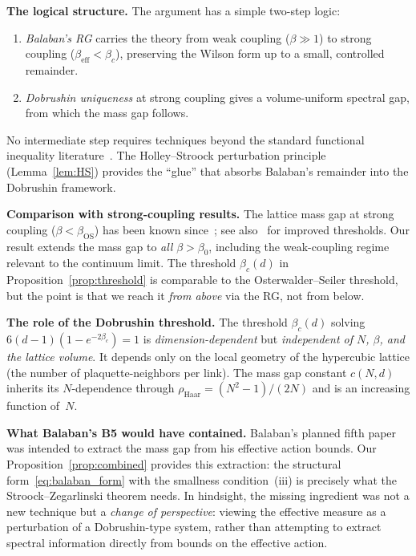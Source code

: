 \documentclass[11pt]{article}
\theoremstyle{definition}
\theoremstyle{remark}
\newcommand{\Haar}{\mathrm{Haar}}
\begin{document}
\textbf{The logical structure.}
The argument has a simple two-step logic:
\begin{enumerate}
\item \emph{Balaban's RG} carries the theory from weak coupling 
  ($\beta \gg 1$) to strong coupling 
  ($\beta_{\mathrm{eff}} < \beta_c$), preserving the Wilson form 
  up to a small, controlled remainder.
\item \emph{Dobrushin uniqueness} at strong coupling gives a 
  volume-uniform spectral gap, from which the mass gap follows.
\end{enumerate}
No intermediate step requires techniques beyond the standard 
functional inequality 
literature~\cite{BGL,SZ92,martinelli_lectures}.  The 
Holley--Stroock perturbation principle (Lemma~\ref{lem:HS}) 
provides the ``glue'' that absorbs Balaban's remainder into the 
Dobrushin framework.

\medskip
\textbf{Comparison with strong-coupling results.}
The lattice mass gap at strong coupling ($\beta < \beta_{\mathrm{OS}}$) 
has been known since~\cite{OS}; see also~\cite{TY83} for improved 
thresholds.  Our result extends the mass gap to \emph{all} 
$\beta > \beta_0$, including the weak-coupling regime relevant to 
the continuum limit.  The threshold $\beta_c(d)$ in 
Proposition~\ref{prop:threshold} is comparable to the 
Osterwalder--Seiler threshold, but the point is that we reach it 
\emph{from above} via the RG, not from below.

\medskip
\textbf{The role of the Dobrushin threshold.}
The threshold $\beta_c(d)$ solving 
$6(d-1)(1-e^{-2\beta_c}) = 1$ is \emph{dimension-dependent} but 
\emph{independent of $N$, $\beta$, and the lattice volume}.  
It depends only on the local geometry of the hypercubic lattice 
(the number of plaquette-neighbors per link).  The mass gap 
constant $c(N,d)$ inherits its $N$-dependence through 
$\rho_{\Haar} = (N^2-1)/(2N)$ and is an increasing function 
of~$N$.

\medskip
\textbf{What Balaban's B5 would have contained.}
Balaban's planned fifth paper was intended to extract the mass gap 
from his effective action bounds.  Our 
Proposition~\ref{prop:combined} provides this extraction: the 
structural form~\eqref{eq:balaban_form} with the 
smallness condition~(iii) is precisely what the 
Stroock--Zegarlinski theorem needs.  In hindsight, the missing 
ingredient was not a new technique but a \emph{change of 
perspective}: viewing the effective measure as a perturbation of 
a Dobrushin-type system, rather than attempting to extract spectral 
information directly from bounds on the effective action.
\end{document}
